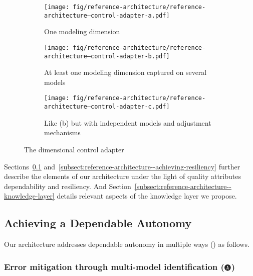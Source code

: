 \begin{figure}[h]
	\begin{subfigure}{.33\textwidth}
		\centering
		\texttt{[image: fig/reference-architecture/reference-architecture--control-adapter-a.pdf]}
		\caption{One modeling dimension}
		\label{fig:reference-architecture--control-adapter-a}
	\end{subfigure}%
	\begin{subfigure}{.33\textwidth}
		\centering
		\texttt{[image: fig/reference-architecture/reference-architecture--control-adapter-b.pdf]}
		\caption{At least one modeling dimension captured on several models}
		\label{fig:reference-architecture--control-adapter-b}
	\end{subfigure}
	\begin{subfigure}{.33\textwidth}
		\centering
		\texttt{[image: fig/reference-architecture/reference-architecture--control-adapter-c.pdf]}
		\caption{Like (b) but with independent models and adjustment mechanisms}
		\label{fig:reference-architecture--control-adapter-c}
	\end{subfigure}
	\caption{The dimensional control adapter}
	\label{fig:reference-architecture--control-adapter}
\end{figure}

Sections~\ref{subsect:reference-architecture--achieving-dependability} and~\ref{subsect:reference-architecture--achieving-resiliency} further describe the elements of our architecture under the light of quality attributes dependability and resiliency. And Section~\ref{subsect:reference-architecture--knowledge-layer} details relevant aspects of the knowledge layer we propose.


\subsection{Achieving a Dependable Autonomy}
\label{subsect:reference-architecture--achieving-dependability}

Our architecture addresses dependable autonomy in multiple ways () as follows.

\subsubsection[Error mitigation through multi-model identification]{Error mitigation through multi-model identification ($\encircleblack{A}$)}

